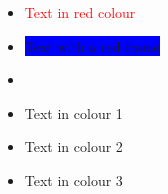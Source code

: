 \documentclass[10pt]{article}
\begin{document}
%
\begin{itemize}
\item \textcolor{red}{Text in red colour}
\item \colorbox{blue}{Text with a red frame}
\item {}
\item \textcolor{color1}{Text in colour 1}
\item \textcolor{color2}{Text in colour 2}
\item \textcolor{color3}{Text in colour 3}
\end{itemize}
%
\end{document}
